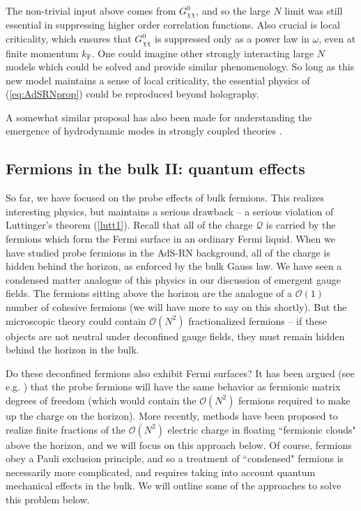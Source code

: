 \documentclass[10pt, oneside]{book}
\begin{document}
\begin{doublespace}
The non-trivial input above comes from $G^0_{\chi\chi}$, and so the large $N$ limit was still essential in suppressing higher order correlation functions.   Also crucial is local criticality, which ensures that $G^0_{\chi\chi}$ is suppressed only as a power law in $\omega$, even at finite momentum $k_{\mathrm{F}}$.    One could imagine other strongly interacting large $N$ models which could be solved and provide similar phenomenology.   So long as this new model maintains a sense of local criticality, the essential physics of (\ref{eq:AdSRNprop}) could be reproduced beyond holography.

A somewhat similar proposal has also been made for understanding the emergence of hydrodynamic modes in strongly coupled theories \cite{Nickel:2010pr}.

\subsection{Fermions in the bulk II:  quantum effects}
So far, we have focused on the probe effects of bulk fermions.   This realizes interesting physics, but maintains a serious drawback -- a serious violation of Luttinger's theorem (\ref{lutt1}).  Recall that all of the charge $\mathcal{Q}$ is carried by the fermions which form the Fermi surface in an ordinary Fermi liquid.   When we have studied probe fermions in the AdS-RN background, all of the charge is hidden behind the horizon, as enforced by the bulk Gauss law.   We have seen a condensed matter analogue of this physics in our discussion of emergent gauge fields.  The fermions sitting above the horizon are the analogue of a $\mathcal{O}(1)$ number of cohesive fermions (we will have more to say on this shortly).   But the microscopic theory could contain $\mathcal{O}(N^2)$ fractionalized fermions -- if these objects are not neutral under deconfined gauge fields, they must remain hidden behind the horizon in the bulk.   

Do these deconfined fermions also exhibit Fermi surfaces?    It has been argued (see e.g. \cite{Gubser:2009qt}) that the probe fermions will have the same behavior as fermionic matrix degrees of freedom (which would contain the $\mathcal{O}(N^2)$ fermions required to make up the charge on the horizon).    More recently, methods have been proposed to realize finite fractions of the $\mathcal{O}(N^2)$ electric charge in floating ``fermionic clouds" above the horizon, and we will focus on this approach below.    Of course, fermions obey a Pauli exclusion principle, and so a treatment of ``condensed" fermions is necessarily more complicated, and requires taking into account quantum mechanical effects in the bulk.  We will outline some of the approaches to solve this problem below. 


\end{doublespace}
\end{document}
